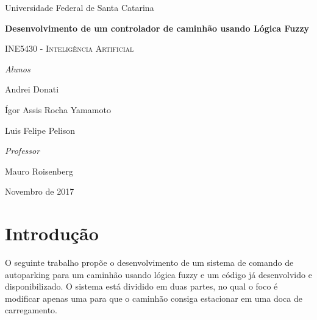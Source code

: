 \documentclass [12pt, a4paper] {article}
\begin{document}
\begin{titlepage}

	\centering
	{\LARGE Universidade Federal de Santa Catarina \par}
	\vspace{4cm}
	{\Huge\bfseries Desenvolvimento de um controlador de caminhão usando Lógica Fuzzy\par}
	\vspace{1cm}
	{\scshape\Large INE5430 - Inteligência Artificial\par}
	\vspace{4cm}
	\emph{Alunos}\par
	{\large Andrei Donati \par}
	{\large Ígor Assis Rocha Yamamoto\par}
    {\large Luis Felipe Pelison\par}
    
	\vspace{1.5cm}
	\emph{Professor}\par
	{\large Mauro Roisenberg\par}

	\vfill
	{\large Novembro de 2017\par}
\end{titlepage}


\tableofcontents
\newpage


\section{Introdução}
O seguinte trabalho propõe o desenvolvimento de um sistema de comando de autoparking para um caminhão usando lógica fuzzy e um código já desenvolvido e disponibilizado. O sistema está dividido em duas partes, no qual o foco é modificar apenas uma para que o caminhão consiga estacionar em uma doca de carregamento.
\end{document}
